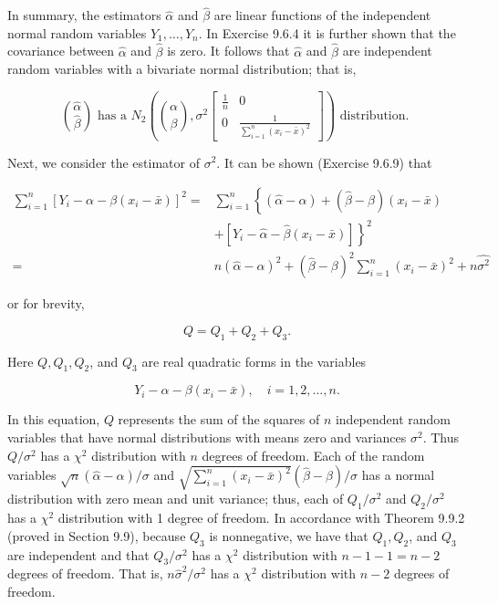 In summary, the estimators $\hat{\alpha}$ and $\hat{\beta}$ are linear functions of the independent normal random variables $Y_{1}, \ldots, Y_{n}$. In Exercise 9.6.4 it is further shown that the covariance between $\hat{\alpha}$ and $\hat{\beta}$ is zero. It follows that $\hat{\alpha}$ and $\hat{\beta}$ are independent random variables with a bivariate normal distribution; that is,

\[
\binom{\hat{\alpha}}{\hat{\beta}} \text { has a } N_{2}\left(\binom{\alpha}{\beta}, \sigma^{2}\left[\begin{array}{cc}
\frac{1}{n} & 0  \tag{9.6.9}\\
0 & \frac{1}{\sum_{i=1}^{n}\left(x_{i}-\bar{x}\right)^{2}}
\end{array}\right]\right) \text { distribution. }
\]

Next, we consider the estimator of $\sigma^{2}$. It can be shown (Exercise 9.6.9) that

$$
\begin{aligned}
\sum_{i=1}^{n}\left[Y_{i}-\alpha-\beta\left(x_{i}-\bar{x}\right)\right]^{2}= & \sum_{i=1}^{n}\left\{(\hat{\alpha}-\alpha)+(\hat{\beta}-\beta)\left(x_{i}-\bar{x}\right)\right. \\
& \left.+\left[Y_{i}-\hat{\alpha}-\hat{\beta}\left(x_{i}-\bar{x}\right)\right]\right\}^{2} \\
= & n(\hat{\alpha}-\alpha)^{2}+(\hat{\beta}-\beta)^{2} \sum_{i=1}^{n}\left(x_{i}-\bar{x}\right)^{2}+n \hat{\sigma^{2}}
\end{aligned}
$$

or for brevity,

$$
Q=Q_{1}+Q_{2}+Q_{3} .
$$

Here $Q, Q_{1}, Q_{2}$, and $Q_{3}$ are real quadratic forms in the variables

$$
Y_{i}-\alpha-\beta\left(x_{i}-\bar{x}\right), \quad i=1,2, \ldots, n .
$$

In this equation, $Q$ represents the sum of the squares of $n$ independent random variables that have normal distributions with means zero and variances $\sigma^{2}$. Thus $Q / \sigma^{2}$ has a $\chi^{2}$ distribution with $n$ degrees of freedom. Each of the random variables $\sqrt{n}(\hat{\alpha}-\alpha) / \sigma$ and $\sqrt{\sum_{i=1}^{n}\left(x_{i}-\bar{x}\right)^{2}}(\hat{\beta}-\beta) / \sigma$ has a normal distribution with zero mean and unit variance; thus, each of $Q_{1} / \sigma^{2}$ and $Q_{2} / \sigma^{2}$ has a $\chi^{2}$ distribution with 1 degree of freedom. In accordance with Theorem 9.9.2 (proved in Section 9.9), because $Q_{3}$ is nonnegative, we have that $Q_{1}, Q_{2}$, and $Q_{3}$ are independent and that $Q_{3} / \sigma^{2}$ has a $\chi^{2}$ distribution with $n-1-1=n-2$ degrees of freedom. That is, $n \hat{\sigma}^{2} / \sigma^{2}$ has a $\chi^{2}$ distribution with $n-2$ degrees of freedom.

